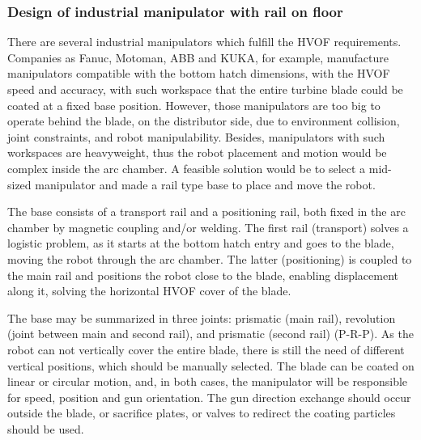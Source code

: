 \subsubsection{Design of industrial manipulator with rail on
floor}\label{proj_manip}

There are several industrial manipulators which fulfill the HVOF requirements.
Companies as Fanuc, Motoman, ABB and KUKA, for example, manufacture manipulators
compatible with the bottom hatch dimensions, with the HVOF speed and accuracy,
with such workspace that the entire turbine blade could be coated at a fixed
base position. However, those manipulators are too big to operate behind the
blade, on the distributor side, due to environment collision, joint
constraints, and robot manipulability. Besides, manipulators with such
workspaces are heavyweight, thus the robot placement and motion would be complex
inside the arc chamber. A feasible solution would be to select a
mid-sized manipulator and made a rail type base to place and move the robot.


The base consists of a transport rail and a positioning rail, both fixed
in the arc chamber by magnetic coupling and/or welding. The first rail
(transport) solves a logistic problem, as it starts at the bottom hatch entry
and goes to the blade, moving the robot through the arc chamber. The latter
(positioning) is coupled to the main rail and positions the robot close to the
blade, enabling displacement along it, solving the horizontal HVOF cover of the
blade.

The base may be summarized in three joints: prismatic (main rail), revolution
(joint between main and second rail), and prismatic (second rail) (P-R-P). As
the robot can not vertically cover the entire blade, there is still the need of
different vertical positions, which should be manually selected. The blade can
be coated on linear or circular motion, and, in both cases, the manipulator will
be responsible for speed, position and gun orientation. The gun direction
exchange should occur outside the blade, or sacrifice plates, or valves to
redirect the coating particles should be used.


